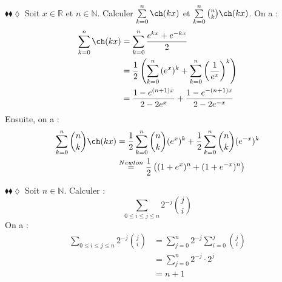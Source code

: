 \documentclass[11pt]{article}
\begin{document}
\begin{exercice}{$\blacklozenge\blacklozenge\lozenge$}{}
    Soit $x\in\mathbb{R}$ et $n\in\mathbb{N}$. Calculer $\sum\limits^{n}_{k=0}{\ch(kx)}$ et $\sum\limits^{n}_{k=0}{\binom{n}{k}\ch(kx)}$.
    \tcblower
    On a :
    \begin{align*}
        \sum\limits^{n}_{k=0}{\ch(kx)}&=\sum\limits^{n}_{k=0}{\frac{e^{kx}+e^{-kx}}{2}}\\
        &=\frac{1}{2}\left(\sum\limits^{n}_{k=0}{(e^x)^k}+\sum\limits^{n}_{k=0}{\left(\frac{1}{e^x}\right)^{k}}\right)\\
        &=\frac{1-e^{(n+1)x}}{2-2e^x}+\frac{1-e^{-(n+1)x}}{2-2e^{-x}}
    \end{align*}
    Ensuite, on a :
    \begin{align*}
        \sum\limits^{n}_{k=0}{\binom{n}{k}\ch(kx)}&=\frac{1}{2}\sum\limits^{n}_{k=0}{\binom{n}{k}(e^x)^k+\frac{1}{2}\sum\limits^{n}_{k=0}{\binom{n}{k}{(e^{-x})^k}}}\\
        &\stackrel{Newton}{=}\frac{1}{2}\left((1+e^x)^n+(1+e^{-x})^n\right)\\
    \end{align*}
\end{exercice}

\pagebreak

\begin{exercice}{$\blacklozenge\blacklozenge\lozenge$}{}
    Soit $n\in\mathbb{N}$. Calculer :
    \begin{equation*}
        \sum\limits_{0\leq{i}\leq{j}\leq{n}}{2^{-j}\binom{j}{i}}
    \end{equation*}
    \tcblower
    On a :
    \begin{align*}
        \sum\limits_{0\leq{i}\leq{j}\leq{n}}{2^{-j}\binom{j}{i}}
        &=\sum\limits^{n}_{j=0}{2^{-j}\sum\limits^{j}_{i=0}{\binom{j}{i}}}\\
        &=\sum\limits^{n}_{j=0}{2^{-j}\cdot2^j}\\
        &=n+1
    \end{align*}
\end{exercice}
\end{document}
